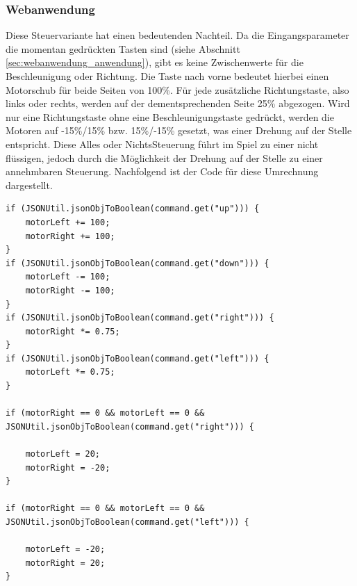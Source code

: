\subsubsection{Webanwendung}
\label{sec:webanwendung_server}
Diese Steuervariante hat einen bedeutenden Nachteil. Da die Eingangsparameter die momentan gedrückten Tasten sind (siehe Abschnitt \ref{sec:webanwendung_anwendung}), gibt es keine Zwischenwerte für die Beschleunigung oder Richtung. Die Taste nach vorne bedeutet hierbei einen Motorschub für beide Seiten von 100\%. Für jede zusätzliche Richtungstaste, also links oder rechts, werden auf der dementsprechenden Seite 25\% abgezogen. Wird nur eine Richtungstaste ohne eine Beschleunigungstaste gedrückt, werden die Motoren auf -15\%/15\% bzw. 15\%/-15\% gesetzt, was einer Drehung auf der Stelle entspricht. Diese \glqq Alles oder Nichts\grqq Steuerung führt im Spiel zu einer nicht flüssigen, jedoch durch die Möglichkeit der Drehung auf der Stelle zu einer annehmbaren Steuerung. Nachfolgend ist der Code für diese Umrechnung dargestellt.

\begin{lstlisting}
if (JSONUtil.jsonObjToBoolean(command.get("up"))) {
	motorLeft += 100;
	motorRight += 100;
}
if (JSONUtil.jsonObjToBoolean(command.get("down"))) {
	motorLeft -= 100;
	motorRight -= 100;
}
if (JSONUtil.jsonObjToBoolean(command.get("right"))) {
	motorRight *= 0.75;
}
if (JSONUtil.jsonObjToBoolean(command.get("left"))) {
	motorLeft *= 0.75;
} 

if (motorRight == 0 && motorLeft == 0 &&
JSONUtil.jsonObjToBoolean(command.get("right"))) {

	motorLeft = 20;
	motorRight = -20;
}

if (motorRight == 0 && motorLeft == 0 &&
JSONUtil.jsonObjToBoolean(command.get("left"))) {

	motorLeft = -20;
	motorRight = 20;
}
\end{lstlisting}
 


